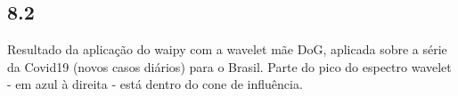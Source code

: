 \begin{figure}[ht!]
	\vspace{0mm}	%
	\begin{center}
	\end{center}
	\vspace{-2mm}	%
	\label{ex8_fig1}
\end{figure}

\clearpage
\subsection*{8.2}
%

Resultado da aplicação do waipy com a wavelet mãe DoG, aplicada sobre a série da Covid19 (novos casos diários) para o Brasil. Parte do pico do espectro wavelet - em azul à direita - está dentro do cone de influência. 

